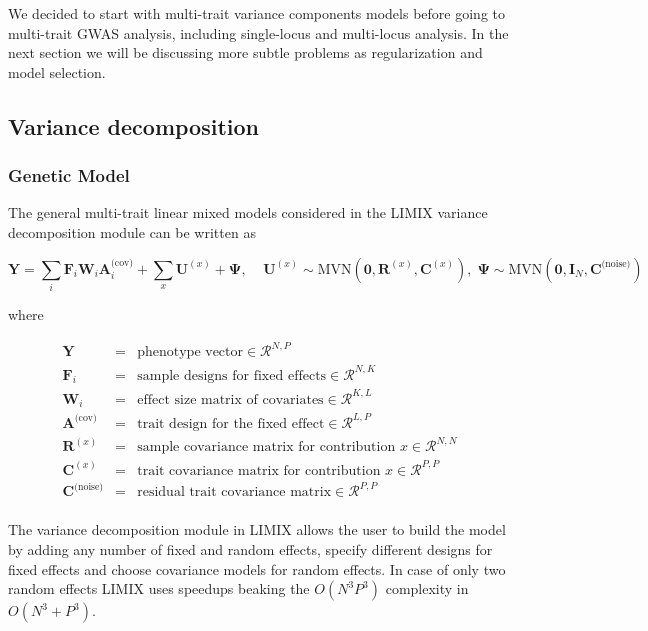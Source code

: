 \documentclass{article}
\begin{document}
We decided to start with multi-trait variance components models before
going to multi-trait GWAS analysis, including single-locus and
multi-locus analysis. In the next section we will be discussing more
subtle problems as regularization and model selection.


    \subsection{Variance decomposition}



    \subsubsection{Genetic Model}


    The general multi-trait linear mixed models considered in the LIMIX
variance decomposition module can be written as

\begin{equation}
\mathbf{Y} = \sum_i\mathbf{F}_i\boldsymbol{W}_i\boldsymbol{A}^\text{(cov)}_i + \sum_{x}\mathbf{U}^{(x)} + \boldsymbol{\Psi},\;\;\;\;
\mathbf{U}^{(x)}\sim\text{MVN}\left(\mathbf{0},\mathbf{R}^{(x)},\mathbf{C}^{(x)}\right),\;
\boldsymbol{\Psi}\sim\text{MVN}\left(\mathbf{0},\mathbf{I}_N,\mathbf{C}^\text{(noise)}\right)
\end{equation}

where

\begin{eqnarray}
\mathbf{Y}   &=& \text{phenotype vector} \in \mathcal{R}^{N,P} \\
\mathbf{F}_i   &=& \text{sample designs for fixed effects} \in \mathcal{R}^{N,K} \\
\mathbf{W}_i   &=& \text{effect size matrix of covariates} \in \mathcal{R}^{K,L} \\
\mathbf{A}^\text{(cov)} &=& \text{trait design for the fixed effect} \in \mathcal{R}^{L,P} \\
\mathbf{R}^{(x)}   &=& \text{sample covariance matrix for contribution $x$} \in \mathcal{R}^{N,N} \\
\mathbf{C}^{(x)}   &=& \text{trait covariance matrix for contribution $x$} \in \mathcal{R}^{P,P} \\
\mathbf{C}^\text{(noise)}   &=& \text{residual trait covariance matrix} \in \mathcal{R}^{P,P} \\
\end{eqnarray}

The variance decomposition module in LIMIX allows the user to build the
model by adding any number of fixed and random effects, specify
different designs for fixed effects and choose covariance models for
random effects. In case of only two random effects LIMIX uses speedups
beaking the $O(N^3P^3)$ complexity in $O(N^3+P^3)$.
\end{document}
